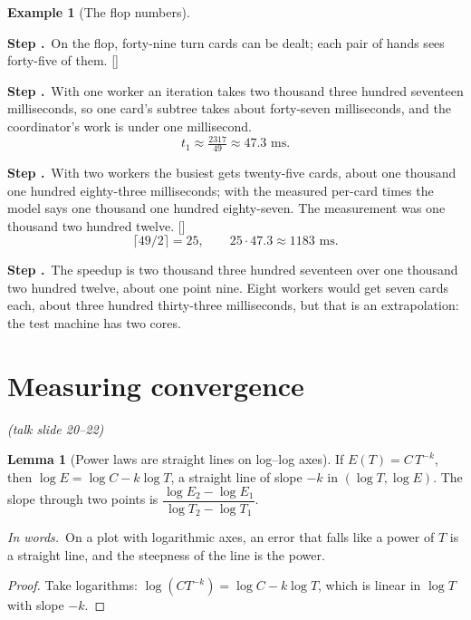 \documentclass[11pt]{article}
\theoremstyle{definition}
\newtheorem{example}[definition]{Example}
\newtheorem{lemma}[definition]{Lemma}
\newcommand{\inwords}{\par\smallskip\noindent\textit{In words.}\ }
\newcounter{stp}
\newcommand{\steps}{\setcounter{stp}{0}}
\newcommand{\st}{\stepcounter{stp}\par\medskip\noindent\textbf{Step \arabic{stp}.}\ }
\newcommand{\by}[1]{\hfill{\small\color{blue!50!black}[#1]}}
\newcommand{\slide}[1]{\hfill{\small\itshape (talk slide #1)}}
\begin{document}
\begin{example}[The flop numbers]\label{ex:par}
\steps
\st On the flop, forty-nine turn cards can be dealt; each pair of hands sees forty-five of them. \by{}
\st With one worker an iteration takes two thousand three hundred seventeen milliseconds, so one card's subtree takes
about forty-seven milliseconds, and the coordinator's work is under one millisecond.
\[ t_1\approx\tfrac{2317}{49}\approx47.3\text{ ms}. \]
\st With two workers the busiest gets twenty-five cards, about one thousand one hundred eighty-three milliseconds; with the
measured per-card times the model says one thousand one hundred eighty-seven. The measurement was one thousand two
hundred twelve. \by{}
\[ \lceil49/2\rceil=25,\qquad25\cdot47.3\approx1183\text{ ms}. \]
\st The speedup is two thousand three hundred seventeen over one thousand two hundred twelve, about one point nine. Eight
workers would get seven cards each, about three hundred thirty-three milliseconds, but that is an extrapolation: the test
machine has two cores.
\end{example}
\begin{center}\end{center}

\section{Measuring convergence}\label{sec:conv}\slide{20--22}
\begin{lemma}[Power laws are straight lines on log--log axes]\label{lem:loglog}
If $E(T)=C\,T^{-k}$, then $\log E=\log C-k\log T$, a straight line of slope $-k$ in $(\log T,\log E)$. The slope through two
points is $\dfrac{\log E_2-\log E_1}{\log T_2-\log T_1}$.
\inwords On a plot with logarithmic axes, an error that falls like a power of $T$ is a straight line, and the steepness
of the line is the power.
\end{lemma}
\begin{proof}
Take logarithms: $\log(CT^{-k})=\log C-k\log T$, which is linear in $\log T$ with slope $-k$.
\end{proof}
\end{document}
